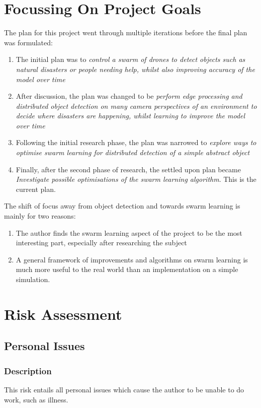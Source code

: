 \documentclass[12pt,a4paper,titlepage]{report}
\begin{document}
	\section{Focussing On Project Goals}
	The plan for this project went through multiple iterations before the final plan was formulated:
	\begin{enumerate}
		\item The initial plan was to \emph{control a swarm of drones to detect objects such as natural disasters or people needing help, whilst also improving accuracy of the model over time}
		\item After discussion, the plan was changed to be \emph{perform edge processing and distributed object detection on many camera perspectives of an environment to decide where disasters are happening, whilst learning to improve the model over time}
		\item Following the initial research phase, the plan was narrowed to \emph{explore ways to optimise swarm learning for distributed detection of a simple abstract object}
		\item Finally, after the second phase of research, the settled upon plan became \emph{Investigate possible optimisations of the swarm learning algorithm}. This is the current plan.
	\end{enumerate}
	The shift of focus away from object detection and towards swarm learning is mainly for two reasons:
	\begin{enumerate}
		\item The author finds the swarm learning aspect of the project to be the most interesting part, especially after researching the subject
		\item A general framework of improvements and algorithms on swarm learning is much more useful to the real world than an implementation on a simple simulation.
	\end{enumerate}

	\section{Risk Assessment}
	\subsection{Personal Issues}
	\subsubsection{Description}
	This risk entails all personal issues which cause the author to be unable to do work, such as illness.
\end{document}
